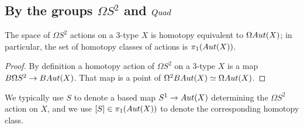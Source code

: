 \documentclass{amsart}
\begin{document}
\subsection{By the groups $\Omega S^2$ and $Quad$} \label{sec-quadaction}

\begin{proposition}
The space of $\Omega S^2$ actions on a 3-type $X$ is homotopy equivalent to $\Omega Aut(X)$; in particular, the set of homotopy classes of actions is $\pi_1(Aut(X))$.
\end{proposition}

\begin{proof}
By definition a homotopy action of $\Omega S^2$ on a 3-type $X$ is a map $B \Omega S^2 \rightarrow BAut(X)$.  That map is a point of $\Omega^2 BAut(X) \simeq \Omega Aut(X)$.
\end{proof}

\nid We typically use $S$ to denote a based map $S^1 \rightarrow Aut(X)$ determining the $\Omega S^2$ action on $X$, and we use $[S] \in \pi_1(Aut(X))$ to denote the corresponding homotopy class.

\end{document}

